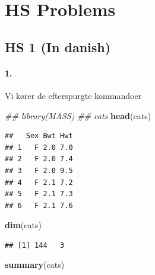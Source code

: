 \documentclass[
]{article}
\newenvironment{Shaded}{\begin{snugshade}}{\end{snugshade}}
\newcommand{\CommentTok}[1]{\textcolor[rgb]{0.56,0.35,0.01}{\textit{#1}}}
\newcommand{\KeywordTok}[1]{\textcolor[rgb]{0.13,0.29,0.53}{\textbf{#1}}}
\newcommand{\NormalTok}[1]{#1}
\begin{document}
\newcommand{\indep}{\perp \!\!\! \perp}

\newcommand{\colvec}[1]{\begin{pmatrix}{#1}\end{pmatrix}}

\newcommand{\nd}[2]{\mc{N}\lrp{{#1},{#2}}}

\newcommand{\dnd}[2]{\sim\mc{N}\lrp{{#1},{#2}}}

\hypertarget{hs-problems}{%
\section{HS Problems}\label{hs-problems}}

\hypertarget{hs-1-in-danish}{%
\subsection{HS 1 (In danish)}\label{hs-1-in-danish}}

\hypertarget{section}{%
\paragraph{\texorpdfstring{\textbf{1.}}{1.}}\label{section}}

Vi kører de efterspurgte kommandoer

\begin{Shaded}
\begin{Highlighting}[]
\CommentTok{## library(MASS)}
\CommentTok{## cats}
\KeywordTok{head}\NormalTok{(cats)}
\end{Highlighting}
\end{Shaded}

\begin{verbatim}
##   Sex Bwt Hwt
## 1   F 2.0 7.0
## 2   F 2.0 7.4
## 3   F 2.0 9.5
## 4   F 2.1 7.2
## 5   F 2.1 7.3
## 6   F 2.1 7.6
\end{verbatim}

\begin{Shaded}
\begin{Highlighting}[]
\KeywordTok{dim}\NormalTok{(cats)}
\end{Highlighting}
\end{Shaded}

\begin{verbatim}
## [1] 144   3
\end{verbatim}

\begin{Shaded}
\begin{Highlighting}[]
\KeywordTok{summary}\NormalTok{(cats)}
\end{Highlighting}
\end{Shaded}
\end{document}
